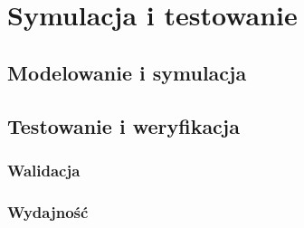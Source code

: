 \section{Symulacja i testowanie}
\subsection{Modelowanie i symulacja}
\subsection{Testowanie i weryfikacja}
\subsubsection{Walidacja}
\subsubsection{Wydajność}